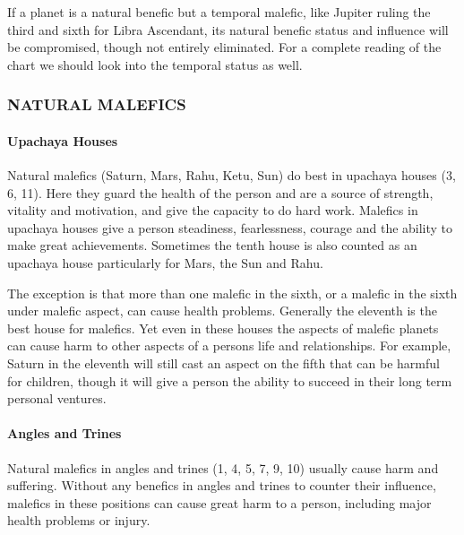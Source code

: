  

If a planet is a natural benefic but a temporal malefic, like Jupiter ruling the third and sixth for Libra Ascendant, its natural benefic status and influence will be compromised, though not entirely eliminated. For a complete reading of the chart we should look into the temporal status as well.

 

\subsubsection{NATURAL MALEFICS}
 

\paragraph{Upachaya Houses}

 

Natural malefics (Saturn, Mars, Rahu, Ketu, Sun) do best in upachaya houses (3, 6, 11). Here they guard the health of the person and are a source of strength, vitality and motivation, and give the capacity to do hard work. Malefics in upachaya houses give a person steadiness, fearlessness, courage and the ability to make great achievements. Sometimes the tenth house is also counted as an upachaya house particularly for Mars, the Sun and Rahu.

 

The exception is that more than one malefic in the sixth, or a malefic in the sixth under malefic aspect, can cause health problems. Generally the eleventh is the best house for malefics. Yet even in these houses the aspects of malefic planets can cause harm to other aspects of a persons life and relationships. For example, Saturn in the eleventh will still cast an aspect on the fifth that can be harmful for children, though it will give a person the ability to succeed in their long term personal ventures.

 

\paragraph{Angles and Trines}

Natural malefics in angles and trines (1, 4, 5, 7, 9, 10) usually cause harm and suffering. Without any benefics in angles and trines to counter their influence, malefics in these positions can cause great harm to a person, including major health problems or injury.

 

